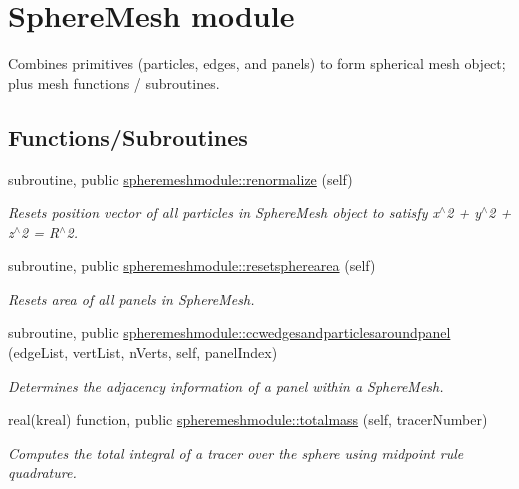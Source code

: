 \hypertarget{group__SphereMesh}{\section{Sphere\+Mesh module}
\label{group__SphereMesh}
}


Combines primitives (particles, edges, and panels) to form spherical mesh object; plus mesh functions / subroutines.  


\subsection*{Functions/\+Subroutines}
\begin{DoxyCompactItemize}
\item 
subroutine, public \hyperlink{group__SphereMesh_ga7e822ca8c1c2f3dbb84c1677b73b01d8}{spheremeshmodule\+::renormalize} (self)
\begin{DoxyCompactList}\small\item\em Resets position vector of all particles in Sphere\+Mesh object to satisfy x$^\wedge$2 + y$^\wedge$2 + z$^\wedge$2 = R$^\wedge$2. \end{DoxyCompactList}\item 
subroutine, public \hyperlink{group__SphereMesh_ga8a8a47063a070aa34913a6ecffd90e62}{spheremeshmodule\+::resetspherearea} (self)
\begin{DoxyCompactList}\small\item\em Resets area of all panels in Sphere\+Mesh. \end{DoxyCompactList}\item 
subroutine, public \hyperlink{group__SphereMesh_ga05c2ef27a6cef4f07bacbeae15d7a290}{spheremeshmodule\+::ccwedgesandparticlesaroundpanel} (edge\+List, vert\+List, n\+Verts, self, panel\+Index)
\begin{DoxyCompactList}\small\item\em Determines the adjacency information of a panel within a Sphere\+Mesh. \end{DoxyCompactList}\item 
real(kreal) function, public \hyperlink{group__SphereMesh_gaff88fd47f20601b9ce1fc3b80f66c180}{spheremeshmodule\+::totalmass} (self, tracer\+Number)
\begin{DoxyCompactList}\small\item\em Computes the total integral of a tracer over the sphere using midpoint rule quadrature. \end{DoxyCompactList}\item 

\end{DoxyCompactItemize}
